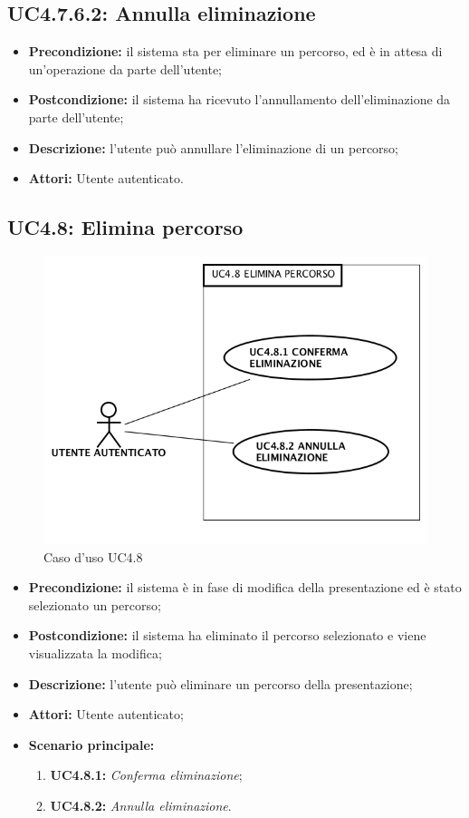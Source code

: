 \subsection{ UC4.7.6.2: Annulla eliminazione}

\begin{itemize}
	\item \textbf{Precondizione:} il sistema sta per eliminare un percorso, ed è in attesa di un'operazione da parte dell'utente;
	\item \textbf{Postcondizione:} il sistema ha ricevuto l'annullamento dell'eliminazione da parte dell'utente;
	\item \textbf{Descrizione:} l'utente può annullare l'eliminazione di un percorso;
	\item \textbf{Attori:} Utente autenticato.
\end{itemize}
\subsection{ UC4.8: Elimina percorso}

\begin{figure}[h]
	\begin{center}
	\includegraphics[scale=0.4]{diagram/UC4-8.png}
	\caption{Caso d'uso UC4.8}
	\end{center}
\end{figure}
\begin{itemize}
	\item \textbf{Precondizione:} il sistema è in fase di modifica della presentazione ed è stato selezionato un percorso;
	\item \textbf{Postcondizione:} il sistema ha eliminato il percorso selezionato e viene visualizzata la modifica;
	\item \textbf{Descrizione:} l'utente può eliminare un percorso della presentazione;
	\item \textbf{Attori:} Utente autenticato;
	\item \textbf{Scenario principale:}
	\begin{enumerate}
		\item \textbf{ UC4.8.1:} \textit{ Conferma eliminazione};
		\item \textbf{ UC4.8.2:} \textit{ Annulla eliminazione}.
	\end{enumerate}
\end{itemize}
